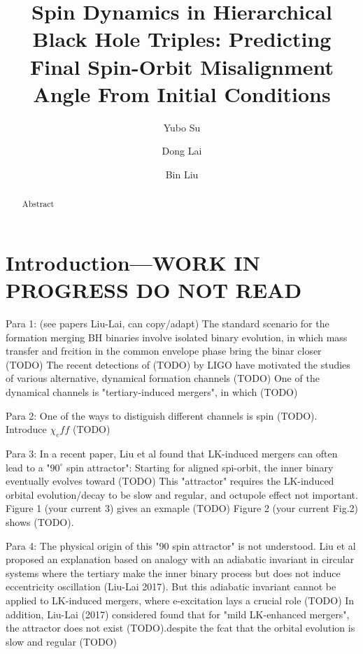 \documentclass[
        twocolumn,
        twocolappendix
    ]{aastex63}
\begin{document}
\title{Spin Dynamics in Hierarchical Black Hole Triples: Predicting Final
Spin-Orbit Misalignment Angle From Initial Conditions}


\author[0000-0001-8283-3425]{Yubo Su}%

\author[0000-0002-1934-6250]{Dong Lai}%

\author[0000-0002-0643-8295]{Bin Liu}%

\begin{abstract}
    Abstract
\end{abstract}


\section{Introduction---WORK IN PROGRESS DO NOT READ}\label{s:intro}

Para 1: (see papers Liu-Lai, can copy/adapt) The standard scenario for the
formation merging BH binaries involve isolated binary evolution, in which mass
transfer and frcition in the common envelope phase bring the binar closer (TODO)
The recent detections of (TODO) by LIGO have motivated the studies of various
alternative, dynamical formation channels (TODO) One of the dynamical channels
is "tertiary-induced mergers", in which (TODO)

Para 2: One of the ways to distiguish different channels is spin (TODO).
Introduce $\chi_eff$ (TODO)

Para 3: In a recent paper, Liu et al found that LK-induced mergers can often
lead to a "$90^\circ$ spin attractor": Starting for aligned spi-orbit, the inner
binary eventually evolves toward (TODO)  This "attractor" requires the
LK-induced orbital evolution/decay to be slow and regular, and octupole effect
not important. Figure 1 (your current 3) gives an exmaple (TODO) Figure 2 (your
current Fig.2) shows (TODO).

Para 4: The physical origin of this "90 spin attractor" is not understood. Liu
et al proposed an explanation based on analogy with an adiabatic invariant in
circular systems where the tertiary make the inner binary process but does not
induce eccentricity oscillation (Liu-Lai 2017). But this adiabatic invariant
cannot be applied to LK-induced mergers, where e-excitation lays a crucial role
(TODO)   In addition, Liu-Lai (2017) considered found that for "mild LK-enhanced
mergers", the attractor does not exist (TODO).despite the fcat that the orbital
evolution is slow and regular (TODO)
\end{document}
